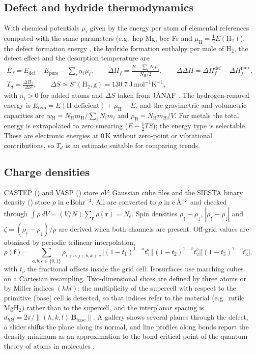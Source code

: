 \subsection{Defect and hydride thermodynamics}
With chemical potentials $\mu_i$ given by the energy per atom of elemental references computed with the same parameters (e.g.\ hcp Mg, bcc Fe and $\mu_\mathrm{H}=\tfrac12E(\mathrm H_2)$), the defect formation energy \cite{freysoldt2014,vandewalle2004}, the hydride formation enthalpy per mole of H$_2$, the defect effect and the desorption temperature are
\begin{gather}
E_f=E_\mathrm{def}-E_\mathrm{pure}-\sum_i n_i\mu_i,\qquad
\Delta H_f=\frac{E-\sum_iN_i\mu_i}{N_\mathrm H/2},\qquad
\Delta\Delta H=\Delta H_f^\mathrm{def}-\Delta H_f^\mathrm{pure},\\
T_d=\frac{\Delta H_f}{\Delta S},\qquad \Delta S\simeq S^\circ(\mathrm H_2,\mathrm g)=130.7\ \mathrm{J\,mol^{-1}K^{-1}},
\end{gather}
with $n_i>0$ for added atoms and $\Delta S$ taken from JANAF \cite{chase1998janaf}. The hydrogen-removal energy is $E_\mathrm{rem}=E(\text{H-deficient})+\mu_\mathrm H-E$, and the gravimetric and volumetric capacities are $w_\mathrm H=N_\mathrm H m_\mathrm H/\sum_iN_im_i$ and $\rho_\mathrm H=N_\mathrm H m_\mathrm H/V$. For metals the total energy is extrapolated to zero smearing ($E-\tfrac12TS$); the energy type is selectable. These are electronic energies at 0\,K without zero-point or vibrational contributions, so $T_d$ is an estimate suitable for comparing trends.

\subsection{Charge densities}
CASTEP () and VASP () store $\rho V$; Gaussian cube files and the SIESTA binary density () store $\rho$ in e\,Bohr$^{-3}$. All are converted to $\rho$ in e\,\AA$^{-3}$ and checked through $\int\rho\,dV=(V/N)\sum_{\mathbf r}\rho(\mathbf r)=N_e$. Spin densities $\rho_\uparrow-\rho_\downarrow$, $|\rho_\uparrow-\rho_\downarrow|$ and $\zeta=(\rho_\uparrow-\rho_\downarrow)/\rho$ are derived when both channels are present. Off-grid values are obtained by periodic trilinear interpolation,
\begin{equation}
\rho(\mathbf f)=\sum_{a,b,c\in\{0,1\}}\rho_{i+a,j+b,k+c}\,\big[(1-t_1)^{1-a}t_1^{a}\big]\big[(1-t_2)^{1-b}t_2^{b}\big]\big[(1-t_3)^{1-c}t_3^{c}\big],
\end{equation}
with $t_\nu$ the fractional offsets inside the grid cell. Isosurfaces use marching cubes \cite{lorensen1987} on a Cartesian resampling. Two-dimensional slices are defined by three atoms or by Miller indices $(hkl)$; the multiplicity of the supercell with respect to the primitive (base) cell is detected, so that indices refer to the material (e.g.\ rutile MgH$_2$) rather than to the supercell, and the interplanar spacing is $d_{hkl}=2\pi/\lVert(h,k,l)\,\mathbf B_\mathrm{base}\rVert$. A gallery shows several planes through the defect, a slider shifts the plane along its normal, and line profiles along bonds report the density minimum as an approximation to the bond critical point of the quantum theory of atoms in molecules \cite{bader1990}.

